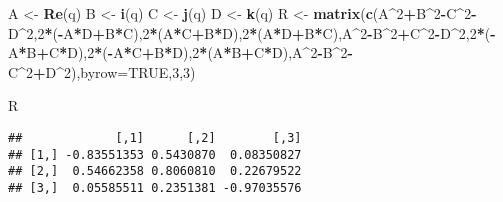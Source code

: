 \documentclass[]{article}
\newenvironment{Shaded}{\begin{snugshade}}{\end{snugshade}}
\newcommand{\KeywordTok}[1]{\textcolor[rgb]{0.13,0.29,0.53}{\textbf{#1}}}
\newcommand{\DataTypeTok}[1]{\textcolor[rgb]{0.13,0.29,0.53}{#1}}
\newcommand{\DecValTok}[1]{\textcolor[rgb]{0.00,0.00,0.81}{#1}}
\newcommand{\StringTok}[1]{\textcolor[rgb]{0.31,0.60,0.02}{#1}}
\newcommand{\OtherTok}[1]{\textcolor[rgb]{0.56,0.35,0.01}{#1}}
\newcommand{\OperatorTok}[1]{\textcolor[rgb]{0.81,0.36,0.00}{\textbf{#1}}}
\newcommand{\NormalTok}[1]{#1}
\begin{document}
\begin{Shaded}
\begin{Highlighting}[]
\NormalTok{A <-}\StringTok{ }\KeywordTok{Re}\NormalTok{(q)}
\NormalTok{B <-}\StringTok{ }\KeywordTok{i}\NormalTok{(q)}
\NormalTok{C <-}\StringTok{ }\KeywordTok{j}\NormalTok{(q)}
\NormalTok{D <-}\StringTok{ }\KeywordTok{k}\NormalTok{(q)}
\NormalTok{R <-}\StringTok{ }\KeywordTok{matrix}\NormalTok{(}\KeywordTok{c}\NormalTok{(A}\OperatorTok{^}\DecValTok{2}\OperatorTok{+}\NormalTok{B}\OperatorTok{^}\DecValTok{2}\OperatorTok{-}\NormalTok{C}\OperatorTok{^}\DecValTok{2}\OperatorTok{-}\NormalTok{D}\OperatorTok{^}\DecValTok{2}\NormalTok{,}\DecValTok{2}\OperatorTok{*}\NormalTok{(}\OperatorTok{-}\NormalTok{A}\OperatorTok{*}\NormalTok{D}\OperatorTok{+}\NormalTok{B}\OperatorTok{*}\NormalTok{C),}\DecValTok{2}\OperatorTok{*}\NormalTok{(A}\OperatorTok{*}\NormalTok{C}\OperatorTok{+}\NormalTok{B}\OperatorTok{*}\NormalTok{D),}\DecValTok{2}\OperatorTok{*}\NormalTok{(A}\OperatorTok{*}\NormalTok{D}\OperatorTok{+}\NormalTok{B}\OperatorTok{*}\NormalTok{C),A}\OperatorTok{^}\DecValTok{2}\OperatorTok{-}\NormalTok{B}\OperatorTok{^}\DecValTok{2}\OperatorTok{+}\NormalTok{C}\OperatorTok{^}\DecValTok{2}\OperatorTok{-}\NormalTok{D}\OperatorTok{^}\DecValTok{2}\NormalTok{,}\DecValTok{2}\OperatorTok{*}\NormalTok{(}\OperatorTok{-}\NormalTok{A}\OperatorTok{*}\NormalTok{B}\OperatorTok{+}\NormalTok{C}\OperatorTok{*}\NormalTok{D),}\DecValTok{2}\OperatorTok{*}\NormalTok{(}\OperatorTok{-}\NormalTok{A}\OperatorTok{*}\NormalTok{C}\OperatorTok{+}\NormalTok{B}\OperatorTok{*}\NormalTok{D),}\DecValTok{2}\OperatorTok{*}\NormalTok{(A}\OperatorTok{*}\NormalTok{B}\OperatorTok{+}\NormalTok{C}\OperatorTok{*}\NormalTok{D),A}\OperatorTok{^}\DecValTok{2}\OperatorTok{-}\NormalTok{B}\OperatorTok{^}\DecValTok{2}\OperatorTok{-}\NormalTok{C}\OperatorTok{^}\DecValTok{2}\OperatorTok{+}\NormalTok{D}\OperatorTok{^}\DecValTok{2}\NormalTok{),}\DataTypeTok{byrow=}\OtherTok{TRUE}\NormalTok{,}\DecValTok{3}\NormalTok{,}\DecValTok{3}\NormalTok{)}

\NormalTok{R}
\end{Highlighting}
\end{Shaded}

\begin{verbatim}
##             [,1]      [,2]        [,3]
## [1,] -0.83551353 0.5430870  0.08350827
## [2,]  0.54662358 0.8060810  0.22679522
## [3,]  0.05585511 0.2351381 -0.97035576
\end{verbatim}

\begin{Shaded}
\end{Shaded}
\end{document}
